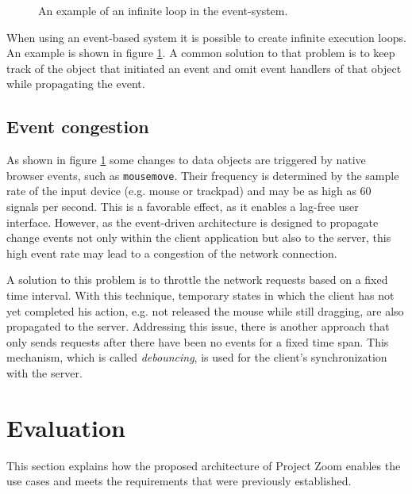 \begin{figure}
\begin{center}
\caption{An example of an infinite loop in the event-system.}
\label{fig:eventcycle}
\end{center}
\end{figure}

When using an event-based system it is possible to create infinite execution loops. An example is shown in figure \ref{fig:eventcycle}. A common solution to that problem is to keep track of the object that initiated an event and omit event handlers of that object while propagating the event. 

\section{Event congestion}
As shown in figure \ref{fig:eventcycle} some changes to data objects are triggered by native browser events, such as \texttt{mousemove}. Their frequency is determined by the sample rate of the input device (e.g. mouse or trackpad) and may be as high as 60 signals per second. This is a favorable effect, as it enables a lag-free user interface. However, as the event-driven architecture is designed to propagate change events not only within the client application but also to the server, this high event rate may lead to a congestion of the network connection. 

A solution to this problem is to throttle the network requests based on a fixed time interval. With this technique, temporary states in which the client has not yet completed his action, e.g. not released the mouse while still dragging, are also propagated to the server. Addressing this issue, there is another approach that only sends requests after there have been no events for a fixed time span. This mechanism, which is called \textit{debouncing}, is used for the client's synchronization with the server. 


\chapter{Evaluation}

This section explains how the proposed architecture of Project Zoom enables the use cases and meets the requirements that were previously established. 

